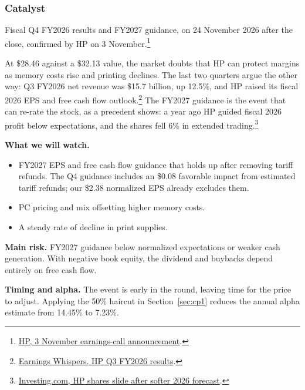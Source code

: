 \documentclass[10pt,a4paper]{article}
\begin{document}
\subsubsection*{Catalyst}
Fiscal Q4 FY2026 results and FY2027 guidance, on 24 November 2026 after the close, confirmed by HP on 3 November.\footnote{\href{https://investor.hp.com/news-events/news/news-details/2026/HP-Inc--to-Announce-Fourth-Quarter-Fiscal-2026-Earnings-on-November-24-2026-and-to-Attend-Upcoming-Investor-Conferences/default.aspx}{HP, 3 November earnings-call announcement}.}

At \$28.46 against a \$32.13 value, the market doubts that HP can protect margins as memory costs rise and printing declines. The last two quarters argue the other way: Q3 FY2026 net revenue was \$15.7 billion, up 12.5\%, and HP raised its fiscal 2026 EPS and free cash flow outlook.\footnote{\href{https://www.earningswhispers.com/epsdetails/HPQ}{Earnings Whispers, HP Q3 FY2026 results}.} The FY2027 guidance is the event that can re-rate the stock, as a precedent shows: a year ago HP guided fiscal 2026 profit below expectations, and the shares fell 6\% in extended trading.\footnote{\href{https://ng.investing.com/news/earnings/hp-inc-shares-slide-after-softer-2026-earnings-forecast-2227859}{Investing.com, HP shares slide after softer 2026 forecast}.}

\textbf{What we will watch.}
\begin{itemize}[leftmargin=1.2em,itemsep=2pt,topsep=2pt]
  \item FY2027 EPS and free cash flow guidance that holds up after removing tariff refunds. The Q4 guidance includes an \$0.08 favorable impact from estimated tariff refunds; our \$2.38 normalized EPS already excludes them.
  \item PC pricing and mix offsetting higher memory costs.
  \item A steady rate of decline in print supplies.
\end{itemize}

\textbf{Main risk.} FY2027 guidance below normalized expectations or weaker cash generation. With negative book equity, the dividend and buybacks depend entirely on free cash flow.

\textbf{Timing and alpha.} The event is early in the round, leaving time for the price to adjust. Applying the 50\% haircut in Section~\ref{sec:cp1} reduces the annual alpha estimate from 14.45\% to 7.23\%.
\end{document}
